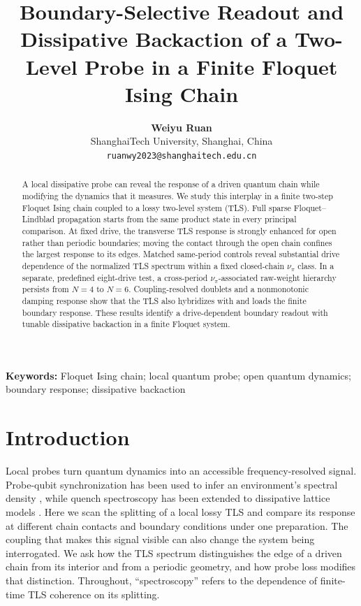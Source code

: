 \documentclass[12pt]{article}
\title{Boundary-Selective Readout and Dissipative Backaction of a Two-Level Probe in a Finite Floquet Ising Chain}
\author{\textbf{Weiyu Ruan}\\
\small ShanghaiTech University, Shanghai, China\\
\small \texttt{ruanwy2023@shanghaitech.edu.cn}}
\date{}
\begin{document}
\maketitle

\begin{abstract}
A local dissipative probe can reveal the response of a driven quantum chain while modifying the dynamics that it measures. We study this interplay in a finite two-step Floquet Ising chain coupled to a lossy two-level system (TLS). Full sparse Floquet--Lindblad propagation starts from the same product state in every principal comparison. At fixed drive, the transverse TLS response is strongly enhanced for open rather than periodic boundaries; moving the contact through the open chain confines the largest response to its edges. Matched same-period controls reveal substantial drive dependence of the normalized TLS spectrum within a fixed closed-chain $\nu_\pi$ class. In a separate, predefined eight-drive test, a cross-period $\nu_\pi$-associated raw-weight hierarchy persists from $N=4$ to $N=6$. Coupling-resolved doublets and a nonmonotonic damping response show that the TLS also hybridizes with and loads the finite boundary response. These results identify a drive-dependent boundary readout with tunable dissipative backaction in a finite Floquet system.
\end{abstract}

\noindent\textbf{Keywords:} Floquet Ising chain; local quantum probe; open quantum dynamics; boundary response; dissipative backaction

\section{Introduction}
\label{sec:introduction}

Local probes turn quantum dynamics into an accessible frequency-resolved signal. Probe-qubit synchronization has been used to infer an environment's spectral density \citep{giorgi2016probing}, while quench spectroscopy has been extended to dissipative lattice models \citep{despres2025quench}. Here we scan the splitting of a local lossy TLS and compare its response at different chain contacts and boundary conditions under one preparation. The coupling that makes this signal visible can also change the system being interrogated. We ask how the TLS spectrum distinguishes the edge of a driven chain from its interior and from a periodic geometry, and how probe loss modifies that distinction. Throughout, ``spectroscopy'' refers to the dependence of finite-time TLS coherence on its splitting.
\end{document}
